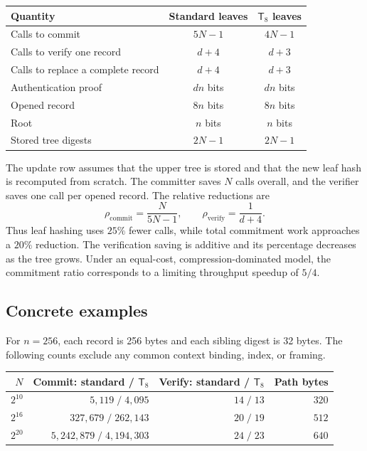 \documentclass[11pt,letterpaper]{article}
\theoremstyle{definition} %
\newcommand{\Tate}{\mathsf{T}_{8}}
\begin{document}
\begin{center}
\begin{tabular}{@{}lcc@{}}
\toprule
Quantity & Standard leaves & $\Tate$ leaves\\
\midrule
Calls to commit & $5N-1$ & $4N-1$\\
Calls to verify one record & $d+4$ & $d+3$\\
Calls to replace a complete record & $d+4$ & $d+3$\\
Authentication proof & $dn$ bits & $dn$ bits\\
Opened record & $8n$ bits & $8n$ bits\\
Root & $n$ bits & $n$ bits\\
Stored tree digests & $2N-1$ & $2N-1$\\
\bottomrule
\end{tabular}
\end{center}

The update row assumes that the upper tree is stored and that the new leaf
hash is recomputed from scratch. The committer saves $N$ calls overall, and
the verifier saves one call per opened record. The relative reductions are
\begin{equation}
 \rho_{\mathrm{commit}}=\frac{N}{5N-1},\qquad
 \rho_{\mathrm{verify}}=\frac{1}{d+4}.
 \label{eq:ratios}
\end{equation}
Thus leaf hashing uses $25\%$ fewer calls, while total commitment work
approaches a $20\%$ reduction. The verification saving is additive and its
percentage decreases as the tree grows. Under an equal-cost,
compression-dominated model, the commitment ratio corresponds to a limiting
throughput speedup of $5/4$.

\subsection{Concrete examples}
For $n=256$, each record is 256 bytes and each sibling digest is 32 bytes.
The following counts exclude any common context binding, index, or framing.

\begin{center}
\small
\begin{tabular}{@{}rrrr@{}}
\toprule
$N$ & Commit: standard / $\Tate$ & Verify: standard / $\Tate$ & Path bytes\\
\midrule
$2^{10}$ & $5{,}119\;/\;4{,}095$ & $14\;/\;13$ & $320$\\
$2^{16}$ & $327{,}679\;/\;262{,}143$ & $20\;/\;19$ & $512$\\
$2^{20}$ & $5{,}242{,}879\;/\;4{,}194{,}303$ & $24\;/\;23$ & $640$\\
\bottomrule
\end{tabular}
\end{center}
\end{document}
